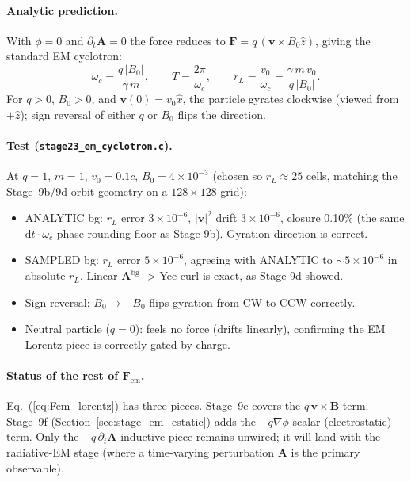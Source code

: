 \documentclass[11pt,a4paper]{article}
\newcommand{\vv}[1]{\mathbf{#1}}
\newcommand{\dd}{\mathrm{d}}
\begin{document}
\paragraph{Analytic prediction.}  With $\phi = 0$ and $\partial_t\vv{A}
= 0$ the force reduces to $\vv{F} = q\,(\vv{v}\!\times\!B_0\hat z)$, giving
the standard EM cyclotron:
\begin{equation}
  \omega_c = \frac{q\,|B_0|}{\gamma\,m},\qquad
  T       = \frac{2\pi}{\omega_c},\qquad
  r_L     = \frac{v_0}{\omega_c} = \frac{\gamma\,m\,v_0}{q\,|B_0|}.
\end{equation}
For $q > 0$, $B_0 > 0$, and $\vv{v}(0) = v_0\hat x$, the particle
gyrates clockwise (viewed from $+\hat z$); sign reversal of either
$q$ or $B_0$ flips the direction.

\paragraph{Test (\texttt{stage23\_em\_cyclotron.c}).}  At
$q = 1$, $m = 1$, $v_0 = 0.1c$, $B_0 = 4\times 10^{-3}$ (chosen so
$r_L \approx 25$ cells, matching the Stage~9b/9d orbit geometry on a
$128\times 128$ grid):
\begin{itemize}
  \item ANALYTIC bg: $r_L$ error $3\times 10^{-6}$,
    $|\vv{v}|^2$ drift $3\times 10^{-6}$,
    closure 0.10\% (the same $\dd t \cdot \omega_c$ phase-rounding
    floor as Stage 9b).  Gyration direction is correct.
  \item SAMPLED bg: $r_L$ error $5\times 10^{-6}$, agreeing with
    ANALYTIC to $\sim 5\times 10^{-6}$ in absolute $r_L$.  Linear
    $\vv{A}^{\mathrm{bg}}$ -> Yee curl is exact, as Stage 9d showed.
  \item Sign reversal: $B_0 \to -B_0$ flips gyration from CW to CCW
    correctly.
  \item Neutral particle ($q = 0$): feels no force (drifts linearly),
    confirming the EM Lorentz piece is correctly gated by charge.
\end{itemize}

\paragraph{Status of the rest of $\vv{F}_{\mathrm{em}}$.}
Eq.~(\ref{eq:Fem_lorentz}) has three pieces.  Stage~9e covers the
$q\,\vv{v}\!\times\!\vv{B}$ term.  Stage~9f
(Section~\ref{sec:stage_em_estatic}) adds the $-q\nabla\phi$ scalar
(electrostatic) term.  Only the $-q\,\partial_t\vv{A}$ inductive piece
remains unwired; it will land with the radiative-EM stage (where a
time-varying perturbation $\vv{A}$ is the primary observable).
\end{document}
